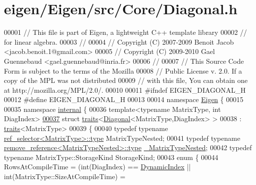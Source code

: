 \hypertarget{eigen_2_eigen_2src_2_core_2_diagonal_8h_source}{}\section{eigen/\+Eigen/src/\+Core/\+Diagonal.h}
\label{eigen_2_eigen_2src_2_core_2_diagonal_8h_source}

\begin{DoxyCode}
00001 \textcolor{comment}{// This file is part of Eigen, a lightweight C++ template library}
00002 \textcolor{comment}{// for linear algebra.}
00003 \textcolor{comment}{//}
00004 \textcolor{comment}{// Copyright (C) 2007-2009 Benoit Jacob <jacob.benoit.1@gmail.com>}
00005 \textcolor{comment}{// Copyright (C) 2009-2010 Gael Guennebaud <gael.guennebaud@inria.fr>}
00006 \textcolor{comment}{//}
00007 \textcolor{comment}{// This Source Code Form is subject to the terms of the Mozilla}
00008 \textcolor{comment}{// Public License v. 2.0. If a copy of the MPL was not distributed}
00009 \textcolor{comment}{// with this file, You can obtain one at http://mozilla.org/MPL/2.0/.}
00010 
00011 \textcolor{preprocessor}{#ifndef EIGEN\_DIAGONAL\_H}
00012 \textcolor{preprocessor}{#define EIGEN\_DIAGONAL\_H}
00013 
00014 \textcolor{keyword}{namespace }\hyperlink{namespace_eigen}{Eigen} \{ 
00015 
00035 \textcolor{keyword}{namespace }\hyperlink{namespaceinternal}{internal} \{
00036 \textcolor{keyword}{template}<\textcolor{keyword}{typename} MatrixType, \textcolor{keywordtype}{int} DiagIndex>
\hyperlink{struct_eigen_1_1internal_1_1traits_3_01_diagonal_3_01_matrix_type_00_01_diag_index_01_4_01_4}{00037} \textcolor{keyword}{struct }\hyperlink{struct_eigen_1_1internal_1_1traits}{traits}<\hyperlink{group___core___module_class_eigen_1_1_diagonal}{Diagonal}<MatrixType,DiagIndex> >
00038  : \hyperlink{struct_eigen_1_1internal_1_1traits}{traits}<MatrixType>
00039 \{
00040   \textcolor{keyword}{typedef} \textcolor{keyword}{typename} \hyperlink{struct_eigen_1_1internal_1_1ref__selector}{ref\_selector<MatrixType>::type} MatrixTypeNested;
00041   \textcolor{keyword}{typedef} \textcolor{keyword}{typename} \hyperlink{group___sparse_core___module}{remove\_reference<MatrixTypeNested>::type} 
      \hyperlink{group___sparse_core___module}{\_MatrixTypeNested};
00042   \textcolor{keyword}{typedef} \textcolor{keyword}{typename} MatrixType::StorageKind StorageKind;
00043   \textcolor{keyword}{enum} \{
00044     RowsAtCompileTime = (int(DiagIndex) == \hyperlink{namespace_eigen_a73c597189a4a99127175e8167c456fff}{DynamicIndex} || int(MatrixType::SizeAtCompileTime) =

\end{DoxyCode}
